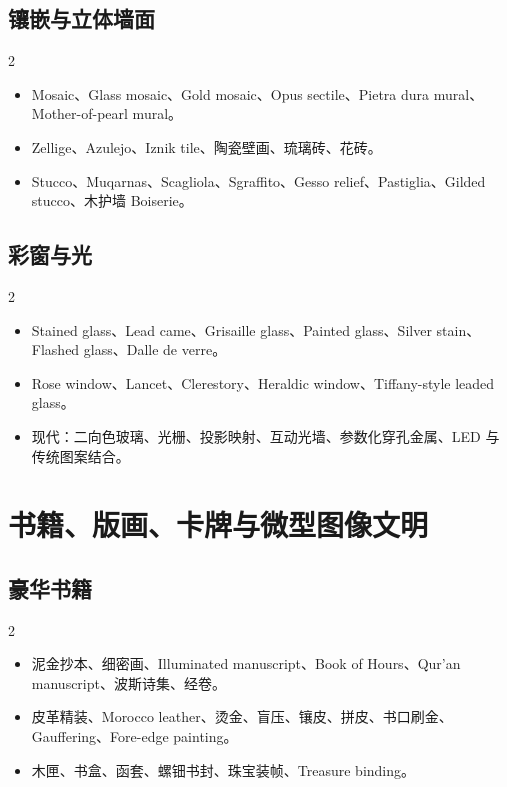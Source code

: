 \documentclass[lang=en,a4paper,11pt]{elegantpaper}
\begin{document}
\subsection{镶嵌与立体墙面}


\begin{multicols}{2}
\begin{itemize}
\item Mosaic、Glass mosaic、Gold mosaic、Opus sectile、Pietra dura mural、Mother-of-pearl mural。
\item Zellige、Azulejo、Iznik tile、陶瓷壁画、琉璃砖、花砖。
\item Stucco、Muqarnas、Scagliola、Sgraffito、Gesso relief、Pastiglia、Gilded stucco、木护墙 Boiserie。
\end{itemize}
\end{multicols}

\subsection{彩窗与光}


\begin{multicols}{2}
\begin{itemize}
\item Stained glass、Lead came、Grisaille glass、Painted glass、Silver stain、Flashed glass、Dalle de verre。
\item Rose window、Lancet、Clerestory、Heraldic window、Tiffany-style leaded glass。
\item 现代：二向色玻璃、光栅、投影映射、互动光墙、参数化穿孔金属、LED 与传统图案结合。
\end{itemize}
\end{multicols}

\section{书籍、版画、卡牌与微型图像文明}


\subsection{豪华书籍}


\begin{multicols}{2}
\begin{itemize}
\item 泥金抄本、细密画、Illuminated manuscript、Book of Hours、Qur'an manuscript、波斯诗集、经卷。
\item 皮革精装、Morocco leather、烫金、盲压、镶皮、拼皮、书口刷金、Gauffering、Fore-edge painting。
\item 木匣、书盒、函套、螺钿书封、珠宝装帧、Treasure binding。
\end{itemize}
\end{multicols}
\end{document}

